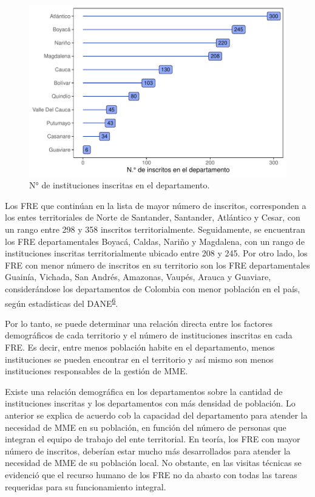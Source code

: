\documentclass[
]{book}
\begin{document}
\begin{figure}

{\centering \includegraphics[width=0.9\linewidth]{InformeFinal_files/figure-latex/institucionesInscritas-1} 

}

\caption{N° de instituciones inscritas en el departamento.}\label{fig:institucionesInscritas}
\end{figure}

Los FRE que continúan en la lista de mayor número de inscritos, corresponden a los entes territoriales de Norte de Santander, Santander, Atlántico y Cesar, con un rango entre 298 y 358 inscritos territorialmente. Seguidamente, se encuentran los FRE departamentales Boyacá, Caldas, Nariño y Magdalena, con un rango de instituciones inscritas territorialmente ubicado entre 208 y 245. Por otro lado, los FRE con menor número de inscritos en su territorio son los FRE departamentales Guainía, Vichada, San Andrés, Amazonas, Vaupés, Arauca y Guaviare, considerándose los departamentos de Colombia con menor población en el país, según estadísticas del DANE\textsuperscript{\protect\hyperlink{ref-DANE2021}{6}}.

Por lo tanto, se puede determinar una relación directa entre los factores demográficos de cada territorio y el número de instituciones inscritas en cada FRE. Es decir, entre menos población habite en el departamento, menos instituciones se pueden encontrar en el territorio y así mismo son menos instituciones responsables de la gestión de MME.

Existe una relación demográfica en los departamentos sobre la cantidad de instituciones inscritas y los departamentos con más densidad de población. Lo anterior se explica de acuerdo cob la capacidad del departamento para atender la necesidad de MME en su población, en función del número de personas que integran el equipo de trabajo del ente territorial. En teoría, los FRE con mayor número de inscritos, deberían estar mucho más desarrollados para atender la necesidad de MME de su población local. No obstante, en las visitas técnicas se evidenció que el recurso humano de los FRE no da abasto con todas las tareas requeridas para su funcionamiento integral.
\end{document}
